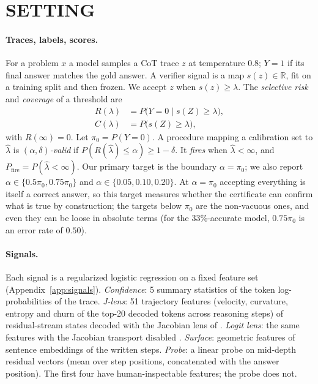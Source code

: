 \documentclass[twoside]{article}
\theoremstyle{remark}
\newcommand{\Rsel}{R}
\newcommand{\lamhat}{\hat\lambda}
\newcommand{\pizero}{\pi_0}
\newcommand{\pfire}{P_{\mathrm{fire}}}
\begin{document}
\section{SETTING}
\label{sec:setting}

\paragraph{Traces, labels, scores.} For a problem $x$ a model samples a CoT trace $z$ at temperature $0.8$; $Y=1$ if its final answer matches the gold answer. A verifier signal is a map $s(z)\in\mathbb{R}$, fit on a training split and then frozen. We accept $z$ when $s(z)\ge\lambda$. The \emph{selective risk} and \emph{coverage} of a threshold are
\begin{align*}
\Rsel(\lambda)&=P\big(Y=0\mid s(Z)\ge\lambda\big),\\
C(\lambda)&=P\big(s(Z)\ge\lambda\big),
\end{align*}
with $\Rsel(\infty)=0$. Let $\pizero=P(Y=0)$. A procedure mapping a calibration set to $\lamhat$ is \emph{$(\alpha,\delta)$-valid} if $P(\Rsel(\lamhat)\le\alpha)\ge1-\delta$. It \emph{fires} when $\lamhat<\infty$, and $\pfire=P(\lamhat<\infty)$. Our primary target is the boundary $\alpha=\pizero$; we also report $\alpha\in\{0.5\pizero,0.75\pizero\}$ and $\alpha\in\{0.05,0.10,0.20\}$. At $\alpha=\pizero$ accepting everything is itself a correct answer, so this target measures whether the certificate can confirm what is true by construction; the targets below $\pizero$ are the non-vacuous ones, and even they can be loose in absolute terms (for the 33\%-accurate model, $0.75\pizero$ is an error rate of $0.50$).

\paragraph{Signals.} Each signal is a regularized logistic regression on a fixed feature set (Appendix~\ref{app:signals}).
\emph{Confidence}: 5 summary statistics of the token log-probabilities of the trace.
\emph{J-lens}: 51 trajectory features (velocity, curvature, entropy and churn of the top-20 decoded tokens across reasoning steps) of residual-stream states decoded with the Jacobian lens of \citet{gurnee2026workspace}.
\emph{Logit lens}: the same features with the Jacobian transport disabled \citep{nostalgebraist2020logit}.
\emph{Surface}: geometric features of sentence embeddings \citep{reimers2019sentence} of the written steps.
\emph{Probe}: a linear probe on mid-depth residual vectors (mean over step positions, concatenated with the answer position).
The first four have human-inspectable features; the probe does not.
\end{document}
